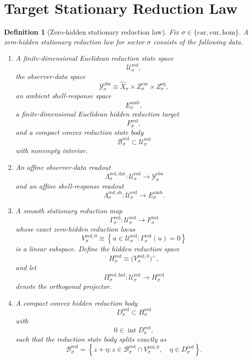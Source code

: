 \documentclass[11pt]{article}
\newcommand{\Car}{\mathrm{car}}
\newcommand{\Cur}{\mathrm{cur}}
\newcommand{\Hom}{\mathrm{hom}}
\newcommand{\VisibleAffine}[1]{\widehat X_{#1}}
\newcommand{\DataSpace}[1]{\mathcal Y_{#1}^{\mathrm{obs}}}
\newcommand{\AmbientTarget}[1]{E_{#1}^{\mathrm{amb}}}
\newcommand{\RedSpace}[1]{\mathcal U_{#1}^{\mathrm{red}}}
\newcommand{\RedBody}[1]{\mathcal B_{#1}^{\mathrm{red}}}
\newcommand{\RedData}[1]{\Lambda_{#1}^{\mathrm{red,dat}}}
\newcommand{\RedShell}[1]{\Lambda_{#1}^{\mathrm{red,sh}}}
\newcommand{\RedTarget}[1]{F_{#1}^{\mathrm{red}}}
\newcommand{\RedMap}[1]{\Gamma_{#1}^{\mathrm{red}}}
\newcommand{\RedZero}[1]{V_{#1}^{\mathrm{red},0}}
\newcommand{\RedHidden}[1]{H_{#1}^{\mathrm{red}}}
\newcommand{\RedHiddenBody}[1]{D_{#1}^{\mathrm{red}}}
\newcommand{\RedProj}[1]{\Pi_{#1}^{\mathrm{red,hid}}}
\newtheorem{definition}{Definition}
\begin{document}
\section{Target Stationary Reduction Law}

\begin{definition}[Zero-hidden stationary reduction law]
\label{def:reduction}
Fix \(\sigma\in\{\Car,\Cur,\Hom\}\). A \emph{zero-hidden stationary reduction law} for sector \(\sigma\) consists of the following data.
\begin{enumerate}
    \item A finite-dimensional Euclidean reduction state space
    \[
    \RedSpace{\sigma},
    \]
    the observer-data space
    \[
    \DataSpace{\sigma}
    \equiv
    \VisibleAffine{\sigma}\times Z_{\sigma}^{\mathrm{cur}}\times Z_{\sigma}^{\mathrm{eq}},
    \]
    an ambient shell-response space
    \[
    \AmbientTarget{\sigma},
    \]
    a finite-dimensional Euclidean hidden reduction target
    \[
    \RedTarget{\sigma},
    \]
    and a compact convex reduction state body
    \[
    \RedBody{\sigma}\subset\RedSpace{\sigma}
    \]
    with nonempty interior.
    \item An affine observer-data readout
    \[
    \RedData{\sigma}:\RedSpace{\sigma}\to\DataSpace{\sigma}
    \]
    and an affine shell-response readout
    \[
    \RedShell{\sigma}:\RedSpace{\sigma}\to\AmbientTarget{\sigma}.
    \]
    \item A smooth stationary reduction map
    \[
    \RedMap{\sigma}:\RedSpace{\sigma}\to\RedTarget{\sigma}
    \]
    whose exact zero-hidden reduction locus
    \[
    \RedZero{\sigma}
    \equiv
    \left\{
    u\in\RedSpace{\sigma}:
    \RedMap{\sigma}(u)=0
    \right\}
    \]
    is a linear subspace. Define the hidden reduction space
    \[
    \RedHidden{\sigma}
    \equiv
    \bigl(\RedZero{\sigma}\bigr)^{\perp},
    \]
    and let
    \[
    \RedProj{\sigma}:\RedSpace{\sigma}\to\RedHidden{\sigma}
    \]
    denote the orthogonal projector.
    \item A compact convex hidden reduction body
    \[
    \RedHiddenBody{\sigma}\subset\RedHidden{\sigma}
    \]
    with
    \[
    0\in\operatorname{int}\RedHiddenBody{\sigma},
    \]
    such that the reduction state body splits exactly as
    \begin{equation}
    \RedBody{\sigma}
    =
    \left\{
    z+\eta:
    z\in\RedBody{\sigma}\cap\RedZero{\sigma},
    \quad
    \eta\in\RedHiddenBody{\sigma}
    \right\}.
    \label{eq:redsplitting}
    \end{equation}

\end{enumerate}
\end{definition}
\end{document}
